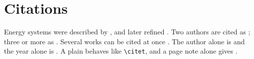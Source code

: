 \documentclass[11pt,a4paper]{article}
\begin{document}
\section{Citations}
Energy systems were described by \citet{odum_energy_1996}, and later
refined \citep[see][p.~10, ch.~2]{odum_energy_1996}. Two authors are
cited as \citet{brown_emergy_2004}; three or more as
\citet{hall_energy_2014}. Several works can be cited at once
\citep{brown_emergy_2004,hall_energy_2014}. The author alone is
\citeauthor{odum_energy_1996} and the year alone is
\citeyear{odum_energy_1996}. A plain \cite{odum_energy_1996} behaves
like \verb|\citet|, and a page note alone gives
\citep[p.~10]{odum_energy_1996}.



\end{document}
